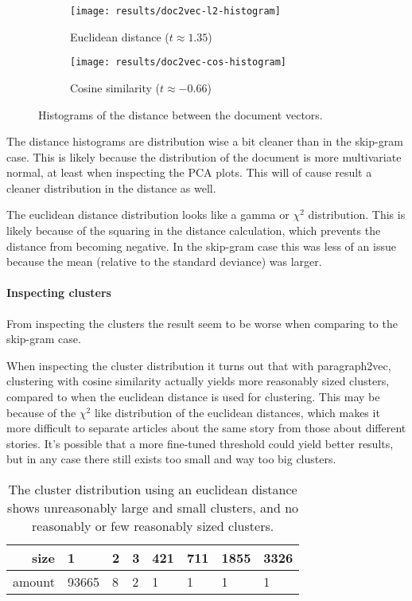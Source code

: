 \begin{figure}[H]
        \centering
        \begin{subfigure}[b]{0.49\textwidth}
                \texttt{[image: results/doc2vec-l2-histogram]}
                \caption{Euclidean distance ($t \approx 1.35$)}
        \end{subfigure}
        \begin{subfigure}[b]{0.49\textwidth}
                \texttt{[image: results/doc2vec-cos-histogram]}
                \caption{Cosine similarity ($t \approx -0.66$)}
        \end{subfigure}
        \caption{Histograms of the distance between the document vectors.}
\end{figure}

The distance histograms are distribution wise a bit cleaner than in the skip-gram case. This is likely because the distribution of the document is more multivariate normal, at least when inspecting the PCA plots. This will of cause result a cleaner distribution in the distance as well.

The euclidean distance distribution looks like a gamma or $\chi^2$ distribution. This is likely because of the squaring in the distance calculation, which prevents the distance from becoming negative. In the skip-gram case this was less of an issue because the mean (relative to the standard deviance) was larger.

\paragraph{Inspecting clusters} From inspecting the clusters the result seem to be worse when comparing to the skip-gram case.

When inspecting the cluster distribution it turns out that with paragraph2vec, clustering with cosine similarity actually yields more reasonably sized clusters, compared to when the euclidean distance is used for clustering. This may be because of the $\chi^2$ like distribution of the euclidean distances, which makes it more difficult to separate articles about the same story from those about different stories. It's possible that a more fine-tuned threshold could yield better results, but in any case there still exists too small and way too big clusters.

\begin{table}[H]
\centering
\begin{tabular}{r|l l l l l l l }
size & 1 & 2 & 3 & 421 & 711 & 1855 & 3326 \\ \hline
amount & 93665 & 8 & 2 & 1 & 1 & 1 & 1
\end{tabular}
\caption{The cluster distribution using an euclidean distance shows unreasonably large and small clusters, and no reasonably or few reasonably sized clusters.}
\end{table}

